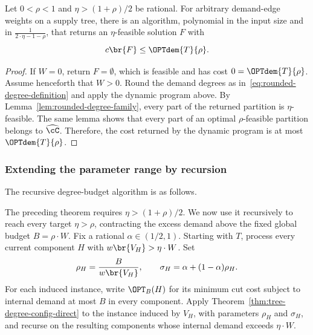 \begin{theorem}\label{thm:tree-degree-config-direct}
    Let $0<\rho<1$ and $\eta>(1+\rho)/2$ be rational. For arbitrary demand-edge weights on a supply tree, there is an algorithm, polynomial in the input size and in $
        \frac{1}{2\cdot\eta-1-\rho}$,
    that returns an $\eta$-feasible solution $F$ with
    \[
        c\br{F}\leq\OPTdem{T}{\rho}.
    \]
\end{theorem}
\begin{proof}
    If $W=0$, return $F=\emptyset$, which is feasible and has cost $0=\OPTdem{T}{\rho}$. Assume henceforth that $W>0$.
    Round the demand degrees as in~\eqref{eq:rounded-degree-definition} and apply the dynamic program above. By Lemma~\ref{lem:rounded-degree-family}, every part of the returned partition is $\eta$-feasible. The same lemma shows that every part of an optimal $\rho$-feasible partition belongs to $\widehat\cC$. Therefore, the cost returned by the dynamic program is at most $\OPTdem{T}{\rho}$.
\end{proof}

\subsubsection{Extending the parameter range by recursion}

The recursive degree-budget algorithm is as follows.



The preceding theorem requires $\eta>(1+\rho)/2$. We now use it recursively to reach every target $\eta>\rho$, contracting the excess demand above the fixed global budget $B=\rho\cdot W$.
Fix a rational $\alpha\in(1/2,1)$. Starting with $T$, process every current component $H$ with $w\br{V_H}>\eta\cdot W$. Set
\[
    \rho_H=\frac{B}{w\br{V_H}},
    \qquad
    \sigma_H=\alpha+(1-\alpha)\rho_H.
\]
For each induced instance, write $\OPT_B(H)$ for its minimum cut cost subject to internal demand at most $B$ in every component. Apply Theorem~\ref{thm:tree-degree-config-direct} to the instance induced by $V_H$, with parameters $\rho_H$ and $\sigma_H$, and recurse on the resulting components whose internal demand exceeds $\eta\cdot W$.

